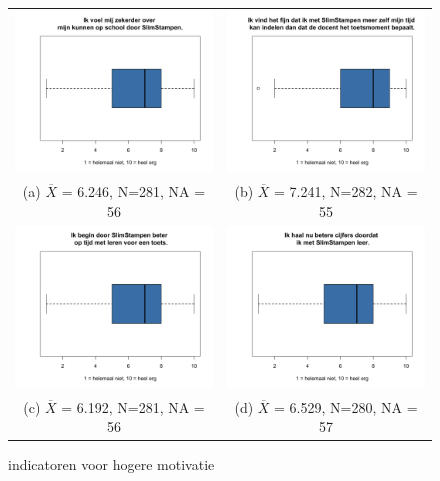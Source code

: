 \documentclass[12pt, a4paper]{article}
\begin{document}
    \begin{figure}
        \begin{tabular}{cc}
          \includegraphics[width=65mm]{images/24-VoelZekerder.png} &   \includegraphics[width=65mm]{images/27-ZelfTijdIndelen.png} \\
        (a) $\overline{X}$ = 6.246, N=281, NA = 56   & (b) $\overline{X}$ = 7.241, N=282, NA = 55  \\[6pt]
         \includegraphics[width=65mm]{images/29-OpTijdBeginnenLeren.png} &   \includegraphics[width=65mm]{images/30-BetereCijfers.png} \\
        (c) $\overline{X}$ = 6.192, N=281, NA = 56  & (d) $\overline{X}$ = 6.529, N=280, NA = 57  \\[6pt]
        \end{tabular}
        \caption{indicatoren voor hogere motivatie}
        \label{fig:motivatie2}
        \end{figure}
\end{document}
